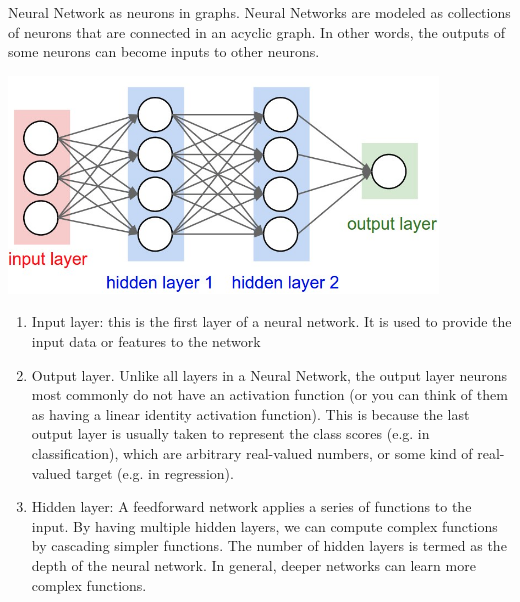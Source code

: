 Neural Network as neurons in graphs. Neural Networks are modeled as collections of neurons that are connected in an acyclic graph. In other words, the outputs of some neurons can become inputs to other neurons.
\begin{center}
\includegraphics[width=\textwidth]{nn-architecture.png}
\end{center}
\begin{enumerate}
\item Input layer: this is the first layer of a neural network. It is used to provide the input data or features to the network
\item Output layer. Unlike all layers in a Neural Network, the output layer neurons most commonly do not have an activation function (or you can think of them as having a linear identity activation function). This is because the last output layer is usually taken to represent the class scores (e.g. in classification), which are arbitrary real-valued numbers, or some kind of real-valued target (e.g. in regression).
\item Hidden layer: A feedforward network applies a series of functions to the input. By having multiple hidden layers, we can compute complex functions by cascading simpler functions. The number of hidden layers is termed as the depth of the neural network. In general, deeper networks can learn more complex functions.
\end{enumerate}
